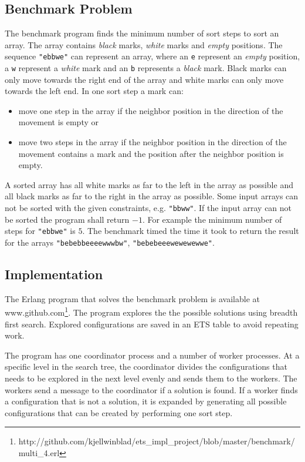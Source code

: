 \documentclass[aps,pre,preprint,nofootinbib]{revtex4}
\begin{document}
  \subsection{Benchmark Problem}
    The benchmark program finds the minimum number of sort steps to sort an array.
    The array contains \emph{black} marks, \emph{white} marks and \emph{empty} positions.
    The sequence \verb|"ebbwe"| can represent an array, where an \verb|e| represent an \emph{empty} position, a \verb|w| represent a \emph{white} mark and an \verb|b| represents a \emph{black} mark.
    Black marks can only move towards the right end of the array and white marks can only move towards the left end.
    In one sort step a mark can:
    \begin{itemize}
     \item move one step in the array if the neighbor position in the direction of the movement is empty or
     \item move two steps in the array if the neighbor position in the direction of the movement contains a mark and the position after the neighbor position is empty.
    \end{itemize}
    A sorted array has all white marks as far to the left in the array as possible and all black marks as far to the right in the array as possible.
    Some input arrays can not be sorted with the given constraints, e.g. \verb|"bbww"|.
    If the input array can not be sorted the program shall return $-1$.
    For example the minimum number of steps for \verb|"ebbwe"| is $5$.
    The benchmark timed the time it took to return the result for the arrays \verb|"bebebbeeeewwwbw"|, \verb|"bebebeeewewewewwe"|.
    
  \subsection{Implementation}
    The Erlang program that solves the benchmark problem is available at www.github.com\footnote{http://github.com/kjellwinblad/ets\_impl\_project/blob/master/benchmark/multi\_4.erl}.
    The program explores the the possible solutions using breadth first search.
    Explored configurations are saved in an ETS table to avoid repeating work.
    
    The program has one coordinator process and a number of worker processes.
    At a specific level in the search tree, the coordinator divides the configurations that needs to be explored in the next level evenly and sends them to the workers.
    The workers send a message to the coordinator if a solution is found.
    If a worker finds a configuration that is not a solution, it is expanded by generating all possible configurations that can be created by performing one sort step.
    
\end{document}
